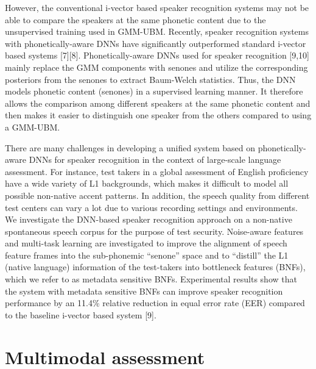 \documentclass{article} %
\begin{document}
However, the conventional i-vector based speaker recognition systems may not be able to compare the speakers at the same phonetic content due to the unsupervised training used in GMM-UBM. Recently, speaker recognition systems with phonetically-aware DNNs have significantly outperformed standard i-vector based systems [7][8]. Phonetically-aware DNNs used for speaker recognition [9,10] mainly replace the GMM components with senones and utilize the corresponding posteriors from the senones to extract Baum-Welch statistics. Thus, the DNN models phonetic content (senones) in a supervised learning manner. It therefore allows the comparison among different speakers at the same phonetic content and then makes it easier to distinguish one speaker from the others compared to using a GMM-UBM.

There are many challenges in developing a unified system based on phonetically-aware DNNs for speaker recognition in the context of large-scale language assessment. For instance, test takers in a global assessment of English proficiency have a wide variety of L1 backgrounds, which makes it difficult to model all possible non-native accent patterns. In addition, the speech quality from different test centers can vary a lot due to various recording settings and environments. We investigate the DNN-based speaker recognition approach on a non-native spontaneous speech corpus for the purpose of test security. Noise-aware features and multi-task learning are investigated to improve the alignment of speech feature frames into the sub-phonemic “senone” space and to “distill” the L1 (native language) information of the test-takers into bottleneck features (BNFs), which we refer to as metadata sensitive BNFs. Experimental results show that the system with metadata sensitive BNFs can improve speaker recognition performance by an 11.4\% relative reduction in equal error rate (EER) compared to the baseline i-vector based system [9].


\section{Multimodal assessment}
\end{document}
